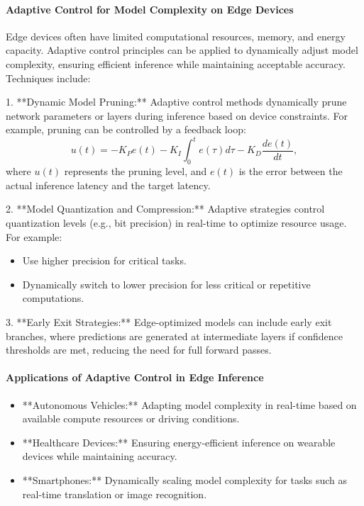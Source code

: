 \documentclass{IEEEojcsys}
\begin{document}
\paragraph{Adaptive Control for Model Complexity on Edge Devices}
Edge devices often have limited computational resources, memory, and energy capacity. Adaptive control principles can be applied to dynamically adjust model complexity, ensuring efficient inference while maintaining acceptable accuracy. Techniques include:

1. **Dynamic Model Pruning:**
   Adaptive control methods dynamically prune network parameters or layers during inference based on device constraints. For example, pruning can be controlled by a feedback loop:
   \[
   u(t) = -K_P e(t) - K_I \int_0^t e(\tau) d\tau - K_D \frac{de(t)}{dt},
   \]
   where $u(t)$ represents the pruning level, and $e(t)$ is the error between the actual inference latency and the target latency.

2. **Model Quantization and Compression:**
   Adaptive strategies control quantization levels (e.g., bit precision) in real-time to optimize resource usage. For example:
   \begin{itemize}
       \item Use higher precision for critical tasks.
       \item Dynamically switch to lower precision for less critical or repetitive computations.
   \end{itemize}

3. **Early Exit Strategies:**
   Edge-optimized models can include early exit branches, where predictions are generated at intermediate layers if confidence thresholds are met, reducing the need for full forward passes.

\paragraph{Applications of Adaptive Control in Edge Inference}
\begin{itemize}
    \item **Autonomous Vehicles:** Adapting model complexity in real-time based on available compute resources or driving conditions.
    \item **Healthcare Devices:** Ensuring energy-efficient inference on wearable devices while maintaining accuracy.
    \item **Smartphones:** Dynamically scaling model complexity for tasks such as real-time translation or image recognition.
\end{itemize}
\end{document}
